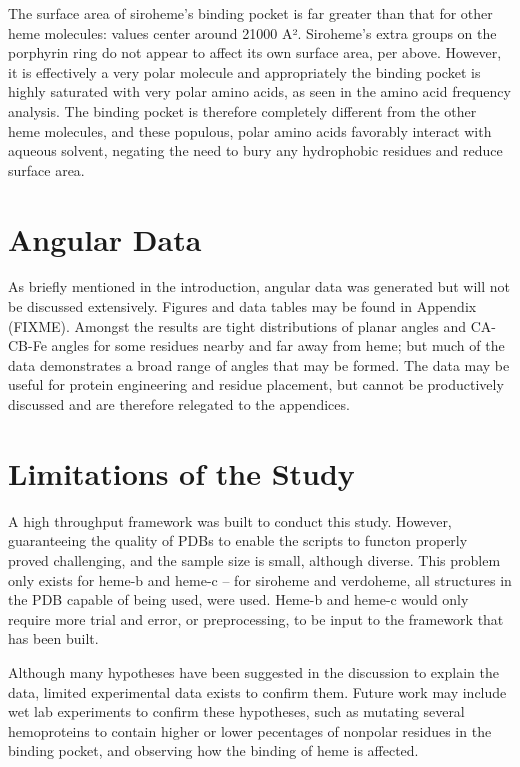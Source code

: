 \documentclass[a4paper, nobind]{templates/ociamthesis}
\begin{document}
The surface area of siroheme's binding pocket is far greater than that for other heme molecules: values center around 21000 A². Siroheme's extra groups on the porphyrin ring do not appear to affect its own surface area, per above. However, it is effectively a very polar molecule and appropriately the binding pocket is highly saturated with very polar amino acids, as seen in the amino acid frequency analysis. The binding pocket is therefore completely different from the other heme molecules, and these populous, polar amino acids favorably interact with aqueous solvent, negating the need to bury any hydrophobic residues and reduce surface area.

\hypertarget{angular-data}{%
\section{Angular Data}\label{angular-data}}

As briefly mentioned in the introduction, angular data was generated but will not be discussed extensively. Figures and data tables may be found in Appendix (FIXME). Amongst the results are tight distributions of planar angles and CA-CB-Fe angles for some residues nearby and far away from heme; but much of the data demonstrates a broad range of angles that may be formed. The data may be useful for protein engineering and residue placement, but cannot be productively discussed and are therefore relegated to the appendices.

\hypertarget{limitations-of-the-study}{%
\section{Limitations of the Study}\label{limitations-of-the-study}}

A high throughput framework was built to conduct this study. However, guaranteeing the quality of PDBs to enable the scripts to functon properly proved challenging, and the sample size is small, although diverse. This problem only exists for heme-b and heme-c -- for siroheme and verdoheme, all structures in the PDB capable of being used, were used. Heme-b and heme-c would only require more trial and error, or preprocessing, to be input to the framework that has been built.

Although many hypotheses have been suggested in the discussion to explain the data, limited experimental data exists to confirm them. Future work may include wet lab experiments to confirm these hypotheses, such as mutating several hemoproteins to contain higher or lower pecentages of nonpolar residues in the binding pocket, and observing how the binding of heme is affected.
\end{document}
